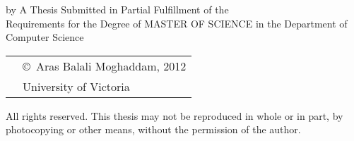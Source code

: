 \pagebreak
{
\centering
\thesistitle
\tpbreak
by
\tpbreak
\nameanddegrees
\tpbreak
A Thesis Submitted in Partial Fulfillment of the \\
Requirements for the Degree of
\tpbreak
MASTER OF SCIENCE
\tpbreak
in the Department of Computer Science\\
\vfill
\begin{tabular}{cl}
& \copyright\ Aras Balali Moghaddam, 2012\\
& \phantom{\copyright} University of Victoria
\end{tabular}
\tpbreak
All rights reserved. This thesis may not be reproduced in whole or in part, by
\\
\hfill photocopying or other means, without the permission of the author. 
\hfill
}
\pagebreak

